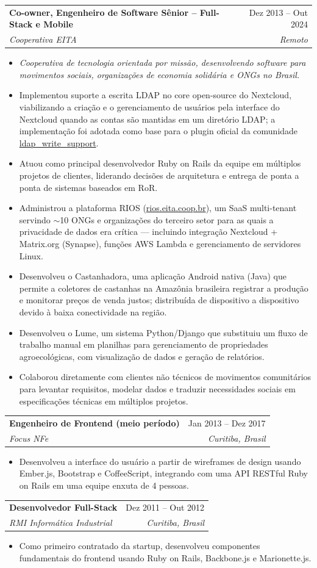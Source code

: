 \documentclass[letterpaper,11pt]{article}
\makeatletter
\newcommand{\resumeItem}[1]{
  \item\small{#1 \vspace{-2pt}}
}
\newcommand{\resumeSubheading}[4]{
  \vspace{-2pt}\item
    \begin{tabular*}{0.97\textwidth}[t]{l@{\extracolsep{\fill}}r}
      \textbf{#1} & #2 \\
      \textit{\small#3} & \textit{\small #4} \\
    \end{tabular*}\vspace{-7pt}
}
\newcommand{\resumeDescription}[1]{%
  \begin{itemize}[leftmargin=0.15in, label={}]
    \item\small{\textit{#1}}
  \end{itemize}\vspace{-10pt}
}
\newcommand{\resumeItemListStart}{\begin{itemize}}
\newcommand{\resumeItemListEnd}{\end{itemize}\vspace{-5pt}}
\makeatother
\begin{document}
  \resumeSubheading
    {Co-owner, Engenheiro de Software Sênior -- Full-Stack e Mobile}{Dez 2013 -- Out 2024}
    {Cooperativa EITA}{Remoto}
  \resumeDescription{Cooperativa de tecnologia orientada por missão, desenvolvendo software para movimentos sociais, organizações de economia solidária e ONGs no Brasil.}
  \resumeItemListStart
    \resumeItem{Implementou suporte a escrita LDAP no core open-source do Nextcloud, viabilizando a criação e o gerenciamento de usuários pela interface do Nextcloud quando as contas são mantidas em um diretório LDAP; a implementação foi adotada como base para o plugin oficial da comunidade \href{https://apps.nextcloud.com/apps/ldap_write_support}{ldap\_write\_support}.}
    \resumeItem{Atuou como principal desenvolvedor Ruby on Rails da equipe em múltiplos projetos de clientes, liderando decisões de arquitetura e entrega de ponta a ponta de sistemas baseados em RoR.}
    \resumeItem{Administrou a plataforma RIOS (\href{https://rios.eita.coop.br}{rios.eita.coop.br}), um SaaS multi-tenant servindo $\sim$10 ONGs e organizações do terceiro setor para as quais a privacidade de dados era crítica --- incluindo integração Nextcloud + Matrix.org (Synapse), funções AWS Lambda e gerenciamento de servidores Linux.}
    \resumeItem{Desenvolveu o Castanhadora, uma aplicação Android nativa (Java) que permite a coletores de castanhas na Amazônia brasileira registrar a produção e monitorar preços de venda justos; distribuída de dispositivo a dispositivo devido à baixa conectividade na região.}
    \resumeItem{Desenvolveu o Lume, um sistema Python/Django que substituiu um fluxo de trabalho manual em planilhas para gerenciamento de propriedades agroecológicas, com visualização de dados e geração de relatórios.}
    \resumeItem{Colaborou diretamente com clientes não técnicos de movimentos comunitários para levantar requisitos, modelar dados e traduzir necessidades sociais em especificações técnicas em múltiplos projetos.}
  \resumeItemListEnd

  \resumeSubheading
    {Engenheiro de Frontend (meio período)}{Jan 2013 -- Dez 2017}
    {Focus NFe}{Curitiba, Brasil}
  \resumeItemListStart
    \resumeItem{Desenvolveu a interface do usuário a partir de wireframes de design usando Ember.js, Bootstrap e CoffeeScript, integrando com uma API RESTful Ruby on Rails em uma equipe enxuta de 4 pessoas.}
  \resumeItemListEnd

  \resumeSubheading
    {Desenvolvedor Full-Stack}{Dez 2011 -- Out 2012}
    {RMI Informática Industrial}{Curitiba, Brasil}
  \resumeItemListStart
    \resumeItem{Como primeiro contratado da startup, desenvolveu componentes fundamentais do frontend usando Ruby on Rails, Backbone.js e Marionette.js.}
  \resumeItemListEnd
\end{document}
